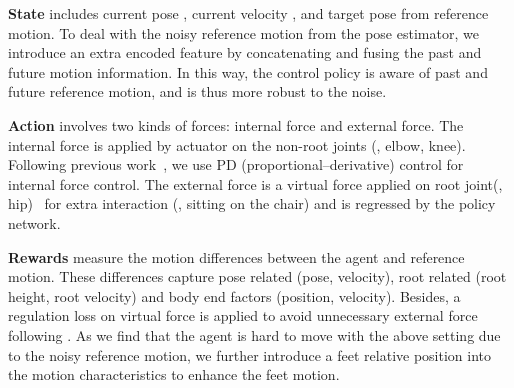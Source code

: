 \documentclass[10pt,twocolumn,letterpaper]{article}
\begin{document}
\noindent \textbf{State} includes current pose , current velocity , and target pose  from reference motion. 
To deal with the noisy reference motion from the pose estimator, we introduce an extra encoded feature  by concatenating and fusing the past and future motion information.
In this way, the control policy is aware of past and future reference motion, and is thus more robust to the noise.

\noindent \textbf{Action} involves two kinds of forces: internal force and external force. 
The internal force is applied by actuator on the non-root joints (\eg, elbow, knee). Following previous work~\cite{peng2017learning}, we use PD (proportional–derivative) control for internal force control.
The external force  is a virtual force applied on root joint(\ie, hip)~\cite{yuan2020residual} for extra interaction (\eg, sitting on the chair) and is regressed by the policy network.


\noindent \textbf{Rewards} measure the motion differences between the agent and reference motion. 
These differences capture pose related (pose, velocity), root related (root height, root velocity) and body end factors (position, velocity).
Besides, a regulation loss on virtual force is applied to avoid unnecessary external force following \cite{yuan2020residual}.
As we find that the agent is hard to move with the above setting due to the noisy reference motion, we further introduce a feet relative position into the motion characteristics
to enhance the feet motion.
\end{document}
